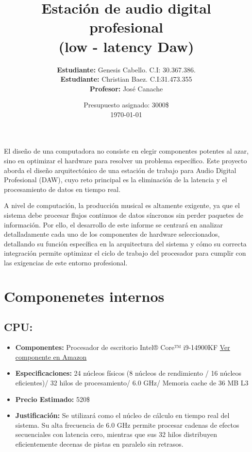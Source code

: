 \documentclass[12pt,a4paper]{article}
\title{\textbf{Estación de audio digital profesional \\ (low - latency Daw)}}
\author{\textbf{Estudiante:} Genesis Cabello. C.I: 30.367.386.\\\textbf{Estudiante:} Christian Baez. C.I:31.473.355\\ \textbf{Profesor:} José Canache}
\date{Presupuesto asignado: 3000\$ \\\today} %
\begin{document}
\maketitle


El diseño de una computadora no consiste en elegir componentes potentes al azar, sino en optimizar el hardware para resolver un problema específico. Este proyecto aborda el diseño arquitectónico de una estación de trabajo para Audio Digital Profesional (DAW), cuyo reto principal es la eliminación de la latencia y el procesamiento de datos en tiempo real.

A nivel de computación, la producción musical es altamente exigente, ya que el sistema debe procesar flujos continuos de datos síncronos sin perder paquetes de información. Por ello, el desarrollo de este informe se centrará en analizar detalladamente cada uno de los componentes de hardware seleccionados, detallando su función específica en la arquitectura del sistema y cómo su correcta integración permite optimizar el ciclo de trabajo del procesador para cumplir con las exigencias de este entorno profesional.

\section{Componenetes internos}

\subsection{CPU:}
\begin{itemize}
    \item \textbf{Componentes:} Procesador de escritorio Intel® Core™ i9-14900KF
 \href{https://www.amazon.com/-/es/Procesador-escritorio-Intel%C2%AE-i9-14900KF-n%C3%BAcleos/dp/B0CHBJXG7G/ref=sims_dp_d_dex_ai_rank_model_1_d_v1_d_sccl_1_3/143-1803879-4455257?pd_rd_w=3oJ84&content-id=amzn1.sym.bb4a0aac-c2b4-4b4b-a0c8-9aa89b28dce3&pf_rd_p=bb4a0aac-c2b4-4b4b-a0c8-9aa89b28dce3&pf_rd_r=W7BHTGWTJCY310H7DC05&pd_rd_wg=bQCUx&pd_rd_r=a066060c-c3db-436d-8833-5dd495200388&pd_rd_i=B0CHBJXG7G&th=1}{Ver componente en Amazon}
    \item \textbf{Especificaciones:} 24 núcleos físicos (8 núcleos de rendimiento / 16 núcleos eficientes)/ 32 hilos de procesamiento/ 6.0 GHz/ Memoria cache de 36 MB L3
    \item \textbf{Precio Estimado:} 520\$
    \item \textbf{Justificación:} Se utilizará como el núcleo de cálculo en tiempo real del sistema. Su alta frecuencia de 6.0 GHz permite procesar cadenas de efectos secuenciales con latencia cero, mientras que sus 32 hilos distribuyen eficientemente decenas de pistas en paralelo sin retrasos.
\end{itemize}
\end{document}
